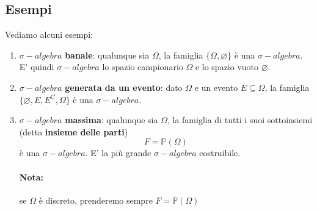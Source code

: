 \documentclass{report}
\newcommand{\Pn}{\mathbb{P}}
\begin{document}
\subsection{Esempi}
Vediamo alcuni esempi: \begin{enumerate}
    \item \(\sigma-algebra\) \textbf{banale}: qualunque sia \(\Omega\), la famiglia \(\{\Omega, \varnothing\}\) è una \(\sigma-algebra\). E' quindi \(\sigma-algebra\) lo spazio campionario \(\Omega\) e lo spazio vuoto \(\varnothing\).
    \item \(\sigma-algebra\) \textbf{generata da un evento}: dato \(\Omega\) e un evento \(E \subseteq \Omega\), la famiglia \(\{\varnothing, E, E^C, \Omega\}\) è una \(\sigma-algebra\).
    \item \(\sigma-algebra\) \textbf{massima}: qualunque sia \(\Omega\), la famiglia di tutti i suoi sottoinsiemi (detta \textbf{insieme delle parti}) \[\textit{F} = \Pn(\Omega)\] è una \(\sigma-algebra\). E' la più grande \(\sigma-algebra\) costruibile. \paragraph{Nota:} se \(\Omega\) è discreto, prenderemo sempre \(\textit{F} = \Pn(\Omega)\) 
\end{enumerate}
\end{document}
